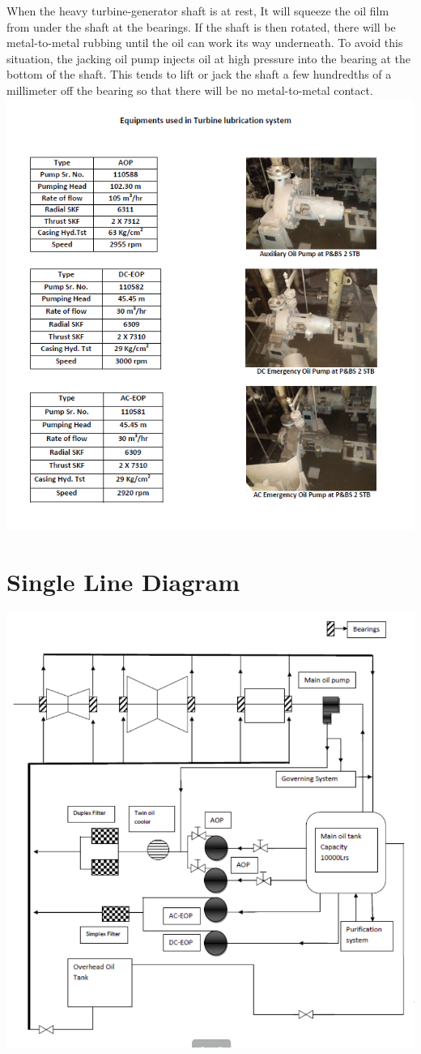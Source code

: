 \documentclass[english,11pt]{report}
\begin{document}
When the heavy turbine-generator shaft is at rest, It will squeeze the oil film from under the shaft at the bearings. If the shaft is then rotated, there will be metal-to-metal rubbing until the oil can work its way underneath. To avoid this situation, the jacking oil pump injects oil at high pressure into the bearing at the bottom of the shaft. This tends to lift or jack the shaft a few hundredths of a millimeter off the bearing so that there will be no metal-to-metal contact.\\
\includegraphics[width = 6in]{equip.png}
\section{Single Line Diagram}
\includegraphics[width = 6in]{turbinelub.png}
\end{document}

